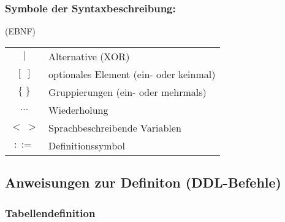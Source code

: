 \subsubsection{Symbole der Syntaxbeschreibung:} (EBNF)\\
\begin{tabular}{c l}
$|$ & Alternative (XOR)\\
$[\;]$ & optionales Element (ein- oder keinmal)\\
$\{\;\}$ & Gruppierungen (ein- oder mehrmals)\\
$...$ & Wiederholung\\
$<\;>$ & Sprachbeschreibende Variablen\\
$::=$ & Definitionssymbol
\end{tabular}
\subsection{Anweisungen zur Definiton (DDL-Befehle)}
\subsubsection{Tabellendefinition}
